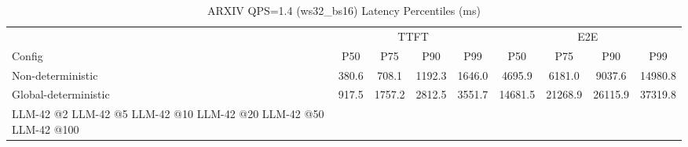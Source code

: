 \begin{table}[htbp]
\centering
\caption{ARXIV QPS=1.4 (ws32_bs16) Latency Percentiles (ms)}
\label{tab:arxiv_qps1.4_ws32_bs16}
\begin{tabular}{l|cccc|cccc}
\toprule
& \multicolumn{4}{c|}{TTFT} & \multicolumn{4}{c}{E2E} \\
Config & P50 & P75 & P90 & P99 & P50 & P75 & P90 & P99 \\
\midrule
Non-deterministic & 380.6 & 708.1 & 1192.3 & 1646.0 & 4695.9 & 6181.0 & 9037.6 & 14980.8 \\
Global-deterministic & 917.5 & 1757.2 & 2812.5 & 3551.7 & 14681.5 & 21268.9 & 26115.9 & 37319.8 \\
LLM-42 @2%
LLM-42 @5%
LLM-42 @10%
LLM-42 @20%
LLM-42 @50%
LLM-42 @100%
\bottomrule
\end{tabular}
\end{table}
